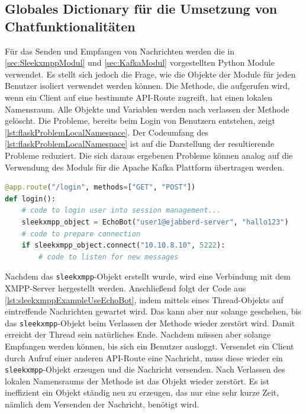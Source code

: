 \documentclass[a4paper,titlepage,halfparskip,12pt]{scrreprt}
\begin{document}
\begin{onehalfspacing}
\section{Globales Dictionary für die Umsetzung von Chatfunktionalitäten}

Für das Senden und Empfangen von Nachrichten werden die in \autoref{sec:SleekxmppModul} und \autoref{sec:KafkaModul} vorgestellten Python Module verwendet. Es stellt sich jedoch die Frage, wie die Objekte der Module für jeden Benutzer isoliert verwendet werden können. Die Methode, die aufgerufen wird, wenn ein Client auf eine bestimmte \acs{API}-Route zugreift, hat einen lokalen Namensraum. Alle Objekte und Variablen werden nach verlassen der Methode gelöscht. Die Probleme, bereits beim Login von Benutzern entstehen, zeigt \autoref{lst:flaskProblemLocalNamespace}. Der Codeumfang des \autoref{lst:flaskProblemLocalNamespace} ist auf die Darstellung der resultierende Probleme reduziert. Die sich daraus ergebenen Probleme können analog auf die Verwendung des Moduls für die Apache Kafka Plattform übertragen werden.

\begin{lstlisting}[language=python, caption={Problem für Chatfunktionalitäten aufgrund des lokalen Namensraums von Methoden}, label={lst:flaskProblemLocalNamespace}]
@app.route("/login", methods=["GET", "POST"])
def login():
	# code to login user into session management...
	sleekxmpp_object = EchoBot("user1@ejabberd-server", "hallo123")
	# code to prepare connection
	if sleekxmpp_object.connect("10.10.8.10", 5222):
		# code to listen for new messages
\end{lstlisting}

Nachdem das \texttt{sleekxmpp}-Objekt erstellt wurde, wird eine Verbindung mit dem \acs{XMPP}-Server hergestellt werden. Anschließend folgt der Code aus \autoref{lst:sleekxmppExampleUseEchoBot}, indem mittels eines Thread-Objekts auf eintreffende Nachrichten gewartet wird. Das kann aber nur solange geschehen, bis das \texttt{sleekxmpp}-Objekt beim Verlassen der Methode wieder zerstört wird. Damit erreicht der Thread sein natürliches Ende. Nachdem müssen aber solange Empfangen werden können, bis sich ein Benutzer ausloggt. Versendet ein Client durch Aufruf einer anderen \acs{API}-Route eine Nachricht, muss diese wieder ein \texttt{sleekxmpp}-Objekt erzeugen und die Nachricht versenden. Nach Verlassen des lokalen Namensraums der Methode ist das Objekt wieder zerstört. Es ist ineffizient ein Objekt ständig neu zu erzeugen, das nur eine sehr kurze Zeit, nämlich dem Versenden der Nachricht, benötigt wird.


\end{onehalfspacing}
\end{document}
